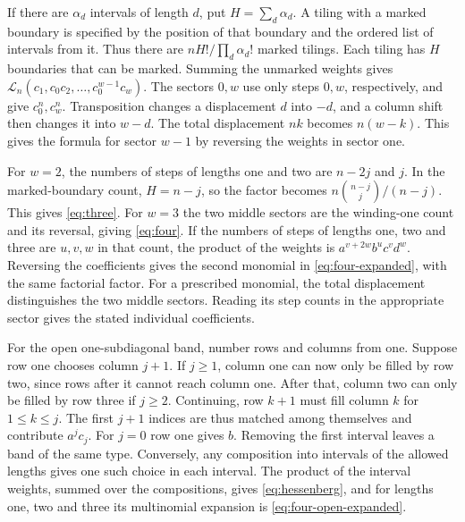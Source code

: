 \documentclass[11pt,reqno]{amsart}
\theoremstyle{remark}
\numberwithin{equation}{section}
\newcommand{\cL}{\mathcal L}
\begin{document}
If there are \(\alpha_d\) intervals of length \(d\), put
\(H=\sum_d\alpha_d\). A tiling with a marked boundary is specified by the
position of that boundary and the ordered list of intervals from it. Thus
there are \(nH!/\prod_d\alpha_d!\) marked tilings. Each tiling has \(H\)
boundaries that can be marked. Summing the unmarked weights gives
\(\cL_n(c_1,c_0c_2,\ldots,c_0^{w-1}c_w)\). The sectors \(0,w\) use only
steps \(0,w\), respectively, and give \(c_0^n,c_w^n\). Transposition
changes a displacement \(d\) into \(-d\), and a column shift then changes
it into \(w-d\). The total displacement \(nk\) becomes \(n(w-k)\). This
gives the formula for sector \(w-1\) by reversing the weights in sector
one.

For \(w=2\), the numbers of steps of lengths one and two are \(n-2j\) and
\(j\). In the marked-boundary count, \(H=n-j\), so the factor becomes
\(n\binom{n-j}{j}/(n-j)\). This gives \eqref{eq:three}. For \(w=3\) the
two middle sectors are the winding-one count and its reversal, giving
\eqref{eq:four}. If the numbers of steps of lengths one, two and three
are \(u,v,w\) in that count, the product of the weights is
\(a^{v+2w}b^uc^vd^w\). Reversing the coefficients gives the second
monomial in \eqref{eq:four-expanded}, with the same factorial factor. For
a prescribed monomial, the total displacement distinguishes the two
middle sectors. Reading its step counts in the appropriate sector gives
the stated individual coefficients.

For the open one-subdiagonal band, number rows and columns from one.
Suppose row one chooses column \(j+1\). If \(j\ge1\), column one can now
only be filled by row two, since rows after it cannot reach column one.
After that, column two can only be filled by row three if \(j\ge2\).
Continuing, row \(k+1\) must fill column \(k\) for \(1\le k\le j\). The
first \(j+1\) indices are thus matched among themselves and contribute
\(a^jc_j\). For \(j=0\) row one gives \(b\). Removing the first interval
leaves a band of the same type. Conversely, any composition into
intervals of the allowed lengths gives one such choice in each interval.
The product of the interval weights, summed over the compositions, gives
\eqref{eq:hessenberg}, and for lengths one, two and three its multinomial
expansion is \eqref{eq:four-open-expanded}.
\end{document}
